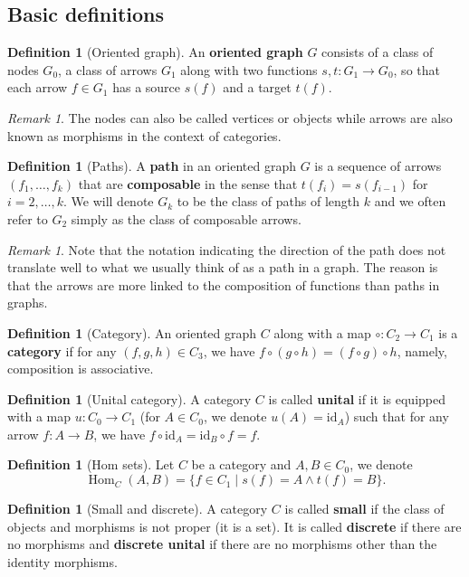 \documentclass{scrartcl}
\theoremstyle{definition}
\newtheorem{defn}[thm]{Definition}
\theoremstyle{remark}
\newtheorem{rem}[thm]{Remark}
\DeclareMathOperator{\Hom}{Hom}
\newcommand{\id}{\text{id}}
\begin{document}
\subsection{Basic definitions}
\begin{defn}[Oriented graph]
    An \textbf{oriented graph} $G$ consists of a class of nodes $G_0$, a class of arrows $G_1$ along with two functions $s,t:G_1 \rightarrow G_0$, so that each arrow $f \in G_1$ has a source $s(f)$ and a target $t(f)$.
\end{defn}
\begin{rem}
The nodes can also be called vertices or objects while arrows are also known as morphisms in the context of categories. 
\end{rem}
\begin{defn}[Paths]
    A \textbf{path} in an oriented graph $G$ is a sequence of arrows $(f_1, \dots, f_k)$ that are \textbf{composable} in the sense that $t(f_i) = s(f_{i-1})$ for $i=2,\dots, k$. We will denote $G_k$ to be the class of paths of length $k$ and we often refer to $G_2$ simply as the class of composable arrows.
\end{defn}
\begin{rem}
    Note that the notation indicating the direction of the path does not translate well to what we usually think of as a path in a graph. The reason is that the arrows are more linked to the composition of functions than paths in graphs.
\end{rem}
\begin{defn}[Category]
    An oriented graph $C$ along with a map $\circ: C_2 \rightarrow C_1$ is a \textbf{category} if for any $(f,g,h) \in C_3$, we have $f\circ(g\circ h) = (f\circ g)\circ h$, namely, composition is associative.
\end{defn}
\begin{defn}[Unital category]
    A category $C$ is called \textbf{unital} if it is equipped with a map $u: C_0 \rightarrow C_1$ (for $A \in C_0$, we denote $u(A) = \id_A$) such that for any arrow $f: A\rightarrow B$, we have $f \circ \id_A = \id_B \circ f = f$.
\end{defn}
\begin{defn}[Hom sets]
    Let $C$ be a category and $A,B \in C_0$, we denote 
    \[ \Hom_{C}(A,B) = \{f \in C_1 \mid s(f) = A \wedge t(f) = B\}. \]
\end{defn}
\begin{defn}[Small and discrete]
    A category $C$ is called \textbf{small} if the class of objects and morphisms is not proper (it is a set). It is called \textbf{discrete} if there are no morphisms and \textbf{discrete unital} if there are no morphisms other than the identity morphisms.
\end{defn}
\end{document}
